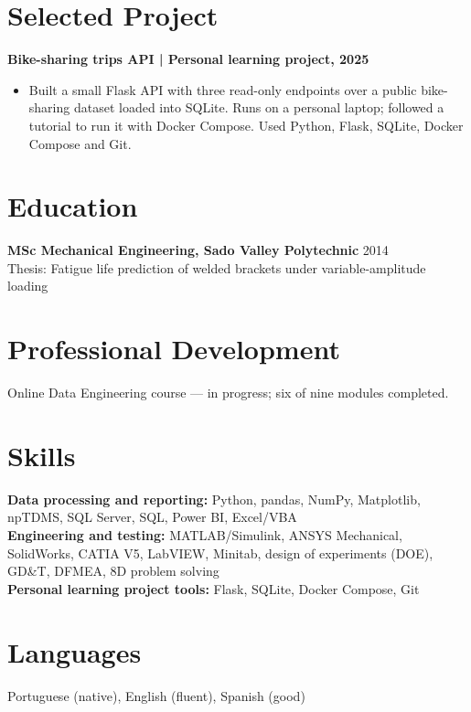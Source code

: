 \documentclass[11pt,a4paper]{article}
\begin{document}
\section*{Selected Project}
\textbf{Bike-sharing trips API | Personal learning project, 2025}
\begin{itemize}
\item Built a small Flask API with three read-only endpoints over a public bike-sharing dataset loaded into SQLite. Runs on a personal laptop; followed a tutorial to run it with Docker Compose. Used Python, Flask, SQLite, Docker Compose and Git.
\end{itemize}

\section*{Education}
\textbf{MSc Mechanical Engineering, Sado Valley Polytechnic} \hfill 2014\\
Thesis: Fatigue life prediction of welded brackets under variable-amplitude loading

\section*{Professional Development}
Online Data Engineering course — in progress; six of nine modules completed.

\section*{Skills}
\textbf{Data processing and reporting:} Python, pandas, NumPy, Matplotlib, npTDMS, SQL Server, SQL, Power BI, Excel/VBA\\
\textbf{Engineering and testing:} MATLAB/Simulink, ANSYS Mechanical, SolidWorks, CATIA V5, LabVIEW, Minitab, design of experiments (DOE), GD\&T, DFMEA, 8D problem solving\\
\textbf{Personal learning project tools:} Flask, SQLite, Docker Compose, Git

\section*{Languages}
Portuguese (native), English (fluent), Spanish (good)
\end{document}
